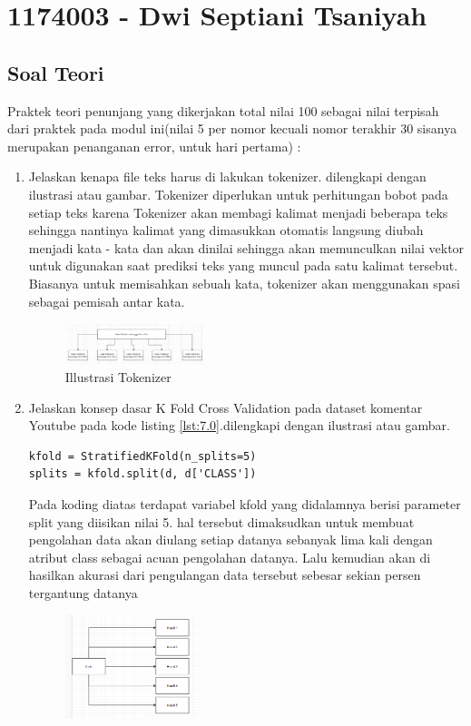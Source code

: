 \section{1174003 - Dwi Septiani Tsaniyah}

\subsection{Soal Teori}
Praktek teori penunjang yang dikerjakan total nilai 100 sebagai nilai terpisah dari praktek pada modul ini(nilai 5 per nomor kecuali nomor terakhir 30 sisanya merupakan penanganan error, untuk hari pertama) :
\begin{enumerate}
\item
Jelaskan kenapa file teks harus di lakukan tokenizer. dilengkapi dengan ilustrasi atau gambar. \hfill \break
Tokenizer diperlukan untuk perhitungan bobot pada setiap teks karena Tokenizer akan membagi kalimat menjadi beberapa teks sehingga nantinya kalimat yang dimasukkan otomatis langsung diubah menjadi kata - kata dan akan dinilai sehingga akan memunculkan nilai vektor untuk digunakan saat prediksi teks yang muncul pada satu kalimat tersebut. Biasanya untuk memisahkan sebuah kata, tokenizer akan menggunakan spasi sebagai pemisah antar kata.
\begin{figure}[H]
    \includegraphics[width=4cm]{figures/1174003/7/teori_1.png}
    \centering
    \caption{Illustrasi Tokenizer}
\end{figure}
\item
Jelaskan konsep dasar K Fold Cross Validation pada dataset komentar Youtube pada kode listing \ref{lst:7.0}.dilengkapi dengan ilustrasi atau gambar.
\begin{lstlisting}[caption=K Fold Cross Validation,label={lst:7.0}]
kfold = StratifiedKFold(n_splits=5)
splits = kfold.split(d, d['CLASS'])
\end{lstlisting}
Pada koding diatas terdapat variabel kfold yang didalamnya berisi parameter split yang diisikan nilai 5. hal tersebut dimaksudkan untuk membuat pengolahan data akan diulang setiap datanya sebanyak lima kali dengan atribut class sebagai acuan pengolahan datanya. Lalu kemudian akan di hasilkan akurasi dari pengulangan data tersebut sebesar sekian persen tergantung datanya
\begin{figure}[H]
    \includegraphics[width=4cm]{figures/1174003/7/teori_2.png}

\end{figure}
\end{enumerate}
